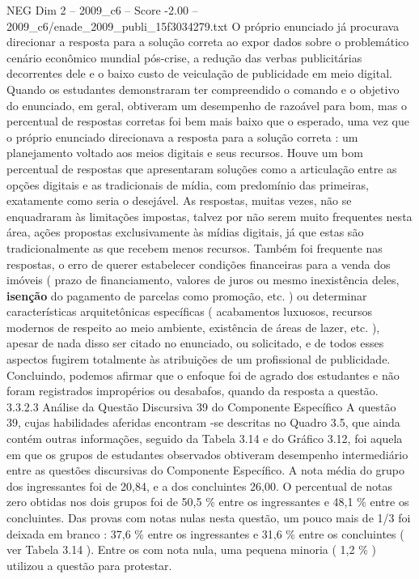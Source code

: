 \begin{textsample}{NEG Dim 2 – 2009\_c6 – Score -2.00 – 2009\_c6/enade\_2009\_publi\_15f3034279.txt}
O próprio enunciado já procurava direcionar a resposta para a solução correta ao expor dados sobre o problemático cenário econômico mundial pós-crise, a redução das verbas publicitárias decorrentes dele e o baixo custo de veiculação de publicidade em meio digital.
Quando os estudantes demonstraram ter compreendido o comando e o objetivo do enunciado, em geral, obtiveram um desempenho de razoável para bom, mas o percentual de respostas corretas foi bem mais baixo que o esperado, uma vez que o próprio enunciado direcionava a resposta para a solução correta : um planejamento voltado aos meios digitais e seus recursos.
Houve um bom percentual de respostas que apresentaram soluções como a articulação entre as opções digitais e as tradicionais de mídia, com predomínio das primeiras, exatamente como seria o desejável.
As respostas, muitas vezes, não se enquadraram às limitações impostas, talvez por não serem muito frequentes nesta área, ações propostas exclusivamente às mídias digitais, já que estas são tradicionalmente as que recebem menos recursos.
Também foi frequente nas respostas, o erro de querer estabelecer condições financeiras para a venda dos imóveis ( prazo de financiamento, valores de juros ou mesmo inexistência deles, \textbf{isenção} do pagamento de parcelas como promoção, etc. ) ou determinar características arquitetônicas específicas ( acabamentos luxuosos, recursos modernos de respeito ao meio ambiente, existência de áreas de lazer, etc. ), apesar de nada disso ser citado no enunciado, ou solicitado, e de todos esses aspectos fugirem totalmente às atribuições de um profissional de publicidade.
Concluindo, podemos afirmar que o enfoque foi de agrado dos estudantes e não foram registrados impropérios ou desabafos, quando da resposta a questão. 3.3.2.3 Análise da Questão Discursiva 39 do Componente Específico A questão 39, cujas habilidades aferidas encontram -se descritas no Quadro 3.5, que ainda contém outras informações, seguido da Tabela 3.14 e do Gráfico 3.12, foi aquela em que os grupos de estudantes observados obtiveram desempenho intermediário entre as questões discursivas do Componente Específico.
A nota média do grupo dos ingressantes foi de 20,84, e a dos concluintes 26,00.
O percentual de notas zero obtidas nos dois grupos foi de 50,5 \% entre os ingressantes e 48,1 \% entre os concluintes.
Das provas com notas nulas nesta questão, um pouco mais de 1/3 foi deixada em branco : 37,6 \% entre os ingressantes e 31,6 \% entre os concluintes ( ver Tabela 3.14 ).
Entre os com nota nula, uma pequena minoria ( 1,2 \% ) utilizou a questão para protestar.

\end{textsample}
